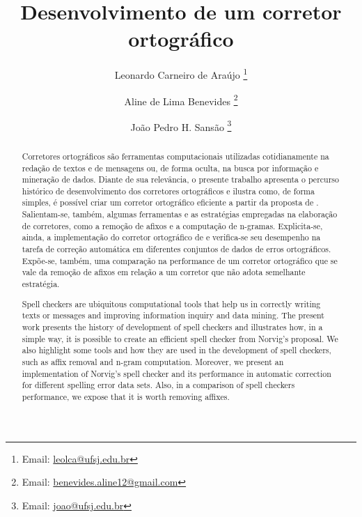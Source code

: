 \documentclass{textolivre}
\title{Desenvolvimento de um corretor ortográfico}
\author[1]{Leonardo Carneiro de Araújo \orcid{0000-0003-3884-2177} \thanks{Email: \url{leolca@ufsj.edu.br}}}
\author[2]{Aline de Lima Benevides \orcid{0000-0003-1814-593X} \thanks{Email: \url{benevides.aline12@gmail.com}}}
\author[1]{João Pedro H. Sansão \orcid{0000-0003-0095-2629} \thanks{Email: \url{joao@ufsj.edu.br}}}
\affil[1]{Universidade Federal de São João del Rei, Brasil.}
\affil[2]{Universidade de São Paulo, Brasil.}
\begin{document}
\maketitle

\begin{polyabstract}
\begin{abstract}
Corretores ortográficos são ferramentas computacionais utilizadas cotidianamente
na redação de textos e de mensagens ou, de forma oculta, na busca por informação e mineração
de dados. Diante de sua relevância, o presente trabalho apresenta
o percurso histórico de desenvolvimento dos corretores ortográficos
e ilustra como, 
de forma simples, é possível criar um corretor ortográfico eficiente a partir
da proposta de \textcite{norvig2007}.
Salientam-se, também, algumas ferramentas e as estratégias empregadas na elaboração
de corretores, como a remoção de afixos e a computação de n-gramas.
Explicita-se, ainda, a implementação do corretor ortográfico de \textcite{norvig2007} e
verifica-se seu desempenho na tarefa de correção automática em diferentes conjuntos de
dados de erros ortográficos. Expõe-se, também, uma comparação na performance de um corretor ortográfico
que se vale da remoção de afixos em relação a um corretor que não adota semelhante estratégia.

\end{abstract}

\begin{english}
\begin{abstract}
Spell checkers are ubiquitous computational tools that help us in correctly writing texts or messages
and improving information inquiry and data mining.
The present work presents the history of development of spell checkers and illustrates how,
in a simple way, it is possible to create an efficient spell checker from Norvig's proposal. %
We also highlight some tools and how they are used in the development of spell checkers, such as affix removal and n-gram computation.
Moreover, we present an implementation of Norvig's spell checker and its performance
in automatic correction for different spelling error data sets.
Also, in a comparison of spell checkers performance, we expose that it is worth removing affixes.

\end{abstract}
\end{english}

\end{polyabstract}
\end{document}
